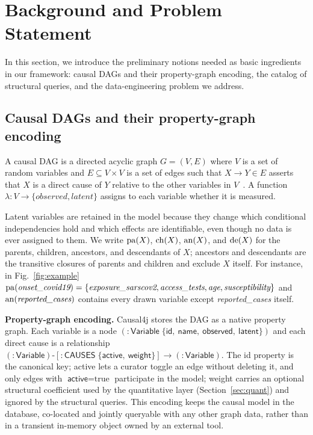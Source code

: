\section{Background and Problem Statement}\label{sec:bg}

In this section, we introduce the preliminary notions needed as basic
ingredients in our framework: causal DAGs and their property-graph encoding,
the catalog of structural queries, and the data-engineering problem we
address.

\subsection{Causal DAGs and their property-graph encoding}\label{sec:bg:dag}

\begin{definition}
A causal DAG is a directed acyclic graph $G=(V,E)$ where $V$ is a set of
random variables and $E \subseteq V \times V$ is a set of edges such that
$X \rightarrow Y \in E$ asserts that $X$ is a direct cause of $Y$ relative to
the other variables in $V$~\cite{pearl2009causality}. A function
$\lambda: V \rightarrow \{\textit{observed}, \textit{latent}\}$ assigns to
each variable whether it is measured.
\end{definition}

Latent variables are retained in the model because they change which
conditional independencies hold and which effects are identifiable, even
though no data is ever assigned to them. We write $\mathrm{pa}(X)$, $\mathrm{ch}(X)$, $\mathrm{an}(X)$,
and $\mathrm{de}(X)$ for the parents, children, ancestors, and descendants of $X$;
ancestors and descendants are the transitive closures of parents and children
and exclude $X$ itself. For instance, in Fig.~\ref{fig:example}
$\mathrm{pa}(\textit{onset\_covid19}) = \{\textit{exposure\_sarscov2},
\textit{access\_tests}, \textit{age}, \textit{susceptibility}\}$ and
$\mathrm{an}(\textit{reported\_cases})$ contains every drawn variable except
\textit{reported\_cases} itself.

\noindent\textbf{Property-graph encoding.} Causal4j stores the DAG as a native
property graph. Each variable is a node
$(:\textsf{Variable}\;\{\textsf{id},\ \textsf{name},\ \textsf{observed},\ \textsf{latent}\})$
and each direct cause is a relationship
$(:\textsf{Variable})\text{-}[:\textsf{CAUSES}\;\{\textsf{active},\ \textsf{weight}\}]\!\rightarrow\!(:\textsf{Variable})$.
The \textsf{id} property is the canonical key; \textsf{active} lets a curator
toggle an edge without deleting it, and only edges with
$\textsf{active}=\text{true}$ participate in the model; \textsf{weight}
carries an optional structural coefficient used by the quantitative layer
(Section~\ref{sec:quant}) and ignored by the structural queries. This
encoding keeps the causal model in the database, co-located and jointly
queryable with any other graph data, rather than in a transient in-memory
object owned by an external tool.

